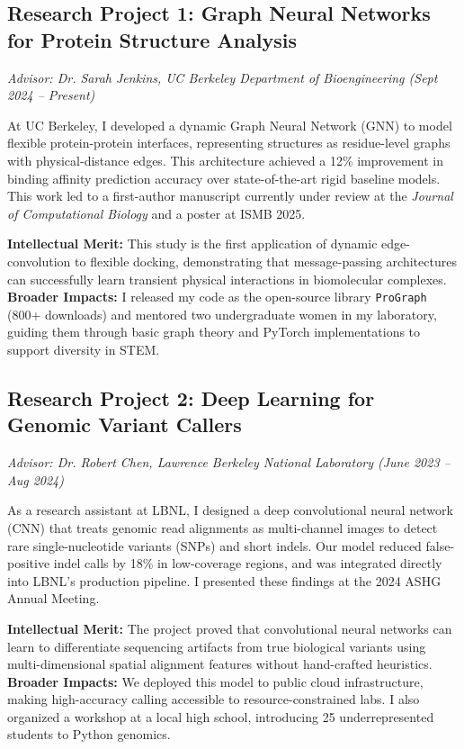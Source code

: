 \documentclass[11pt,letterpaper]{article}
\newcommand{\newpar}{\par\vspace{4pt}\noindent}
\begin{document}
\subsection{Research Project 1: Graph Neural Networks for Protein Structure Analysis}
\textit{Advisor: Dr. Sarah Jenkins, UC Berkeley Department of Bioengineering (Sept 2024 -- Present)}
\newpar
At UC Berkeley, I developed a dynamic Graph Neural Network (GNN) to model flexible protein-protein interfaces, representing structures as residue-level graphs with physical-distance edges. This architecture achieved a 12\% improvement in binding affinity prediction accuracy over state-of-the-art rigid baseline models. This work led to a first-author manuscript currently under review at the \textit{Journal of Computational Biology} and a poster at ISMB 2025.
\newpar
\textbf{\textcolor{accent}{Intellectual Merit:}} This study is the first application of dynamic edge-convolution to flexible docking, demonstrating that message-passing architectures can successfully learn transient physical interactions in biomolecular complexes. \textbf{\textcolor{accent}{Broader Impacts:}} I released my code as the open-source library \texttt{ProGraph} (800+ downloads) and mentored two undergraduate women in my laboratory, guiding them through basic graph theory and PyTorch implementations to support diversity in STEM.

\subsection{Research Project 2: Deep Learning for Genomic Variant Callers}
\textit{Advisor: Dr. Robert Chen, Lawrence Berkeley National Laboratory (June 2023 -- Aug 2024)}
\newpar
As a research assistant at LBNL, I designed a deep convolutional neural network (CNN) that treats genomic read alignments as multi-channel images to detect rare single-nucleotide variants (SNPs) and short indels. Our model reduced false-positive indel calls by 18\% in low-coverage regions, and was integrated directly into LBNL's production pipeline. I presented these findings at the 2024 ASHG Annual Meeting.
\newpar
\textbf{\textcolor{accent}{Intellectual Merit:}} The project proved that convolutional neural networks can learn to differentiate sequencing artifacts from true biological variants using multi-dimensional spatial alignment features without hand-crafted heuristics. \textbf{\textcolor{accent}{Broader Impacts:}} We deployed this model to public cloud infrastructure, making high-accuracy calling accessible to resource-constrained labs. I also organized a workshop at a local high school, introducing 25 underrepresented students to Python genomics.
\end{document}
